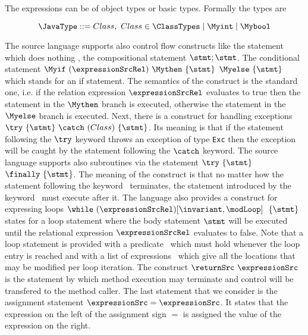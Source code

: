     The expressions can be of object types or basic types. Formally the types are 

    $$
\JavaType ::= Class, \ Class \in \ClassTypes \mid \Myint \mid \Mybool
$$ 





  The source language supports also control flow constructs like  the statement which does nothing \Myskip, the  compositional statement
  $\stmt;\stmt$. The conditional statement
  $\Myif \ (\expressionSrcRel) \ \Mythen \ \{ \stmt \} $ $  \Myelse \ \{ \stmt \}  $ which stands for
  an if statement.%
   The semantics of the construct is the standard one, i.e. if the relation expression $\expressionSrcRel$ 
  evaluates to true then the statement in the $ \Mythen$ branch is executed, otherwise the statement in the
  $\Myelse$ branch is executed. Next, there is a construct for handling exceptions $ \try  \ \{ \stmt \}  \ \catch \ ( Class  )\ \{ \stmt \}  $.
  Its meaning is that if the statement following the $ \try $ keyword throws an exception of type \texttt{Exc} then
  the exception will be caught by the statement following the  $ \catch $ keyword. The source language supports also 
  subroutines via the statement $ \try  \ \{ \stmt \}  $ $ \finally \ \{ \stmt \}$.  The meaning of the construct is that  
  no matter how the statement following the keyword \try \ terminates,
  the statement introduced by the keyword \finally \ must execute after it. The language also provides a construct for expressing loops 
   $ \while \ (\expressionSrcRel) \lbrack \invariant, \modLoop \rbrack \ \do \ \{ \stmt \} $ states for a loop statement where the body 
   statement $ \stmt$ will be executed until the relational expression  $\expressionSrcRel$ evaluates to false.
   Note that a loop statement is provided with a predicate \invariant \ which must hold whenever the loop entry is reached and with a list of expressions
   \modLoop \ which give all the locations that  may be modified per loop iteration. The construct $ \returnSrc \  \expressionSrc $ is
   the statement by which method execution may terminate and control will be transfered to the method caller.
   The last statement that we consider is the assignment statement $ \expressionSrc = \expressionSrc$.
    It states that the expression on the left of the assignment sign $=$ is assigned the value of the expression on the right.

